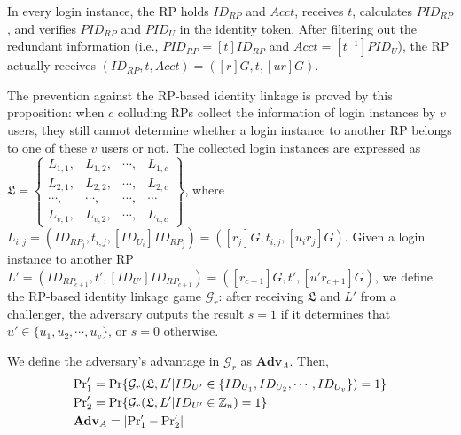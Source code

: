 In every login instance,
    the RP holds $ID_{RP}$ and $Acct$, receives $t$, calculates $PID_{RP}$,
    and verifies $PID_{RP}$ and $PID_U$ in the identity token.
After filtering out the redundant information (i.e., $PID_{RP}= [t]{ID_{RP}}$ and $Acct = [t^{-1}]PID_{U}$),
    the RP actually receives $(ID_{RP}, t, Acct) = ([r]G, t, [ur]G)$.

The prevention against the RP-based identity linkage is proved
    by this proposition:
when $c$ colluding RPs collect the information of login instances by $v$ users,
    they still cannot determine whether a login instance to another RP belongs to one of these $v$ users or not.
The collected login instances are expressed as $\mathfrak{L}=\left\{ \begin{matrix}
L_{1,1}, & L_{1,2}, & \cdots, & L_{1,c}\\
L_{2,1}, & L_{2,2}, & \cdots, & L_{2,c}\\
\cdots, & \cdots, & \cdots, & \cdots\\
L_{v,1}, & L_{v,2}, & \cdots, & L_{v,c}
\end{matrix}\right\}$, where $L_{i, j} = (ID_{RP_j}, t_{i, j}, [ID_{U_i}]{ID_{RP_j}}) = ([r_j]G, t_{i,j}, [u_ir_j]G)$.
Given a login instance to another RP $L'=(ID_{RP_{c+1}}, t', [ID_{U'}]ID_{RP_{c+1}}) = ([r_{c+1}]G, t', [u'r_{c+1}]G)$,
we define the RP-based identity linkage game $\mathcal{G}_r$:
after receiving $\mathfrak{L}$ and $L'$ from a challenger,
    the adversary outputs the result $s = 1$ if it determines that $u' \in \{u_1, u_2, \cdots, u_v\}$,
        or $s = 0$ otherwise.


We define the adversary's advantage in $\mathcal{G}_r$ as $\mathbf{Adv}_A$.
Then,
\begin{align*}
&{\rm Pr}'_1={\rm Pr}\{\mathcal{G}_r(\mathfrak{L}, L'|ID_{U'} \in \{ID_{U_1}, ID_{U_2}, \cdots, ID_{U_v}\})=1\} \\
&{\rm Pr}'_2={\rm Pr}\{\mathcal{G}_r(\mathfrak{L}, L'|ID_{U'} \in \mathbb{Z}_n)=1\}\\
&{\mathbf{Adv}}_A=|{\rm Pr}'_1-{\rm Pr}'_2|
\end{align*}

